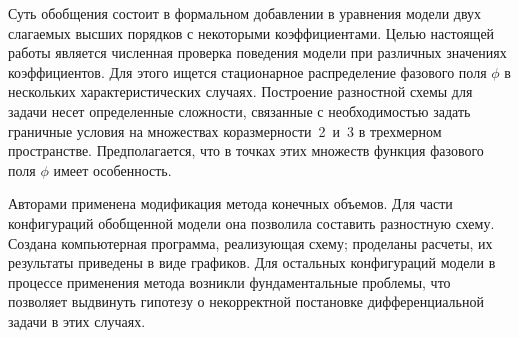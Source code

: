 Суть обобщения состоит в формальном добавлении в уравнения модели двух слагаемых высших порядков с некоторыми коэффициентами. Целью настоящей работы является численная проверка поведения модели при различных значениях коэффициентов. Для этого ищется стационарное распределение фазового поля $\phi$ в нескольких характеристических случаях. Построение разностной схемы для задачи несет определенные сложности, связанные с необходимостью задать граничные условия на множествах коразмерности~2~и~3 в трехмерном пространстве. Предполагается, что в точках этих множеств функция фазового поля $\phi$ имеет особенность.

Авторами применена модификация метода конечных объемов. Для части конфигураций обобщенной модели она позволила составить разностную схему. Создана компьютерная программа, реализующая схему; проделаны расчеты, их результаты приведены в виде графиков. Для остальных конфигураций модели в процессе применения метода возникли фундаментальные проблемы, что позволяет выдвинуть гипотезу о некорректной постановке дифференциальной задачи в этих случаях.